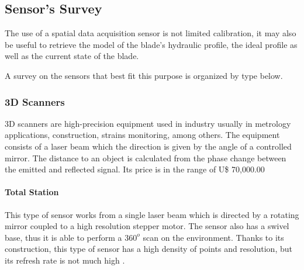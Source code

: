 
\subsection{Sensor's Survey}

The use of a spatial data acquisition sensor is not limited calibration, it may
also be useful to retrieve the model of the blade's hydraulic profile,
the ideal profile as well as the current state of the blade.

A survey on the sensors that best fit this purpose is organized by type
below.




\subsubsection{3D Scanners}

3D scanners are high-precision equipment used in industry usually in metrology
applications, construction, strains monitoring, among others. The equipment
consists of a laser beam which the direction is given by the angle of a
controlled mirror.
The distance to an object is calculated from the phase change between the
emitted and reflected signal. Its price is in the range of U\$ 70,000.00


\paragraph{Total Station}


This type of sensor works from a single laser beam which is directed by a
rotating mirror coupled to a high resolution stepper motor. The sensor also has
a swivel base, thus it is able to perform a $360^o$ scan on the environment.
Thanks to its construction, this type of sensor has a high density of points
and resolution, but its refresh rate is not much high .

